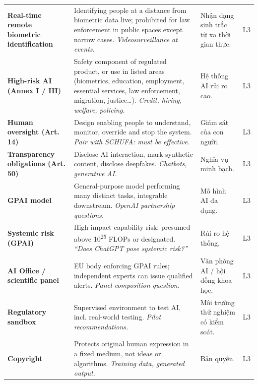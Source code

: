 \documentclass[11pt,a4paper]{article}
\begin{document}
{\begin{longtable}{>{\RaggedRight\arraybackslash\bfseries}p{3.3cm}>{\RaggedRight\arraybackslash}p{5.1cm}>{\RaggedRight\arraybackslash}p{5.1cm}>{\centering\arraybackslash}p{0.8cm}}
Real-time remote biometric identification & Identifying people at a distance from biometric data live; prohibited for law enforcement in public spaces except narrow cases. \newline\textit{\color{teal}Videosurveillance at events.} & \textcolor{tipc}{Nhận dạng sinh trắc từ xa thời gian thực.} & L3\\[3pt]
High-risk AI (Annex I / III) & Safety component of regulated product, or use in listed areas (biometrics, education, employment, essential services, law enforcement, migration, justice…). \newline\textit{\color{teal}Credit, hiring, welfare, policing.} & \textcolor{tipc}{Hệ thống AI rủi ro cao.} & L3\\[3pt]
Human oversight (Art. 14) & Design enabling people to understand, monitor, override and stop the system. \newline\textit{\color{teal}Pair with SCHUFA: must be effective.} & \textcolor{tipc}{Giám sát của con người.} & L3\\[3pt]
Transparency obligations (Art. 50) & Disclose AI interaction, mark synthetic content, disclose deepfakes. \newline\textit{\color{teal}Chatbots, generative AI.} & \textcolor{tipc}{Nghĩa vụ minh bạch.} & L3\\[3pt]
GPAI model & General-purpose model performing many distinct tasks, integrable downstream. \newline\textit{\color{teal}OpenAI partnership questions.} & \textcolor{tipc}{Mô hình AI đa dụng.} & L3\\[3pt]
Systemic risk (GPAI) & High-impact capability risk; presumed above 10\textsuperscript{25} FLOPs or designated. \newline\textit{\color{teal}“Does ChatGPT pose systemic risk?”} & \textcolor{tipc}{Rủi ro hệ thống.} & L3\\[3pt]
AI Office / scientific panel & EU body enforcing GPAI rules; independent experts can issue qualified alerts. \newline\textit{\color{teal}Panel-composition question.} & \textcolor{tipc}{Văn phòng AI / hội đồng khoa học.} & L3\\[3pt]
Regulatory sandbox & Supervised environment to test AI, incl. real-world testing. \newline\textit{\color{teal}Pilot recommendations.} & \textcolor{tipc}{Môi trường thử nghiệm có kiểm soát.} & L3\\[3pt]
Copyright & Protects original human expression in a fixed medium, not ideas or algorithms. \newline\textit{\color{teal}Training data, generated output.} & \textcolor{tipc}{Bản quyền.} & L3\\[3pt]

\end{longtable}}
\end{document}
